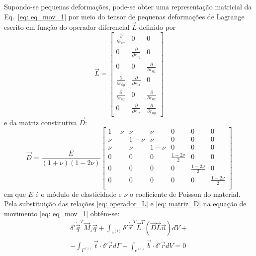 Supondo-se pequenas deformações, pode-se obter uma representação matricial da Eq.~\eqref{eq: eq_mov_1} por meio
do tensor de pequenas deformações de Lagrange escrito em função do operador diferencial
$\vec{L}$ definido por
\begin{equation}
    \vec{L} = \begin{bmatrix}
        \frac{\partial }{\partial r_{0x}} & 0 & 0 \\
        0 & \frac{\partial }{\partial r_{0y}} & 0 \\
        0 & 0 & \frac{\partial }{\partial r_{0z}} \\
        \frac{\partial }{\partial r_{0y}} & \frac{\partial }{\partial r_{0x}} & 0 \\
        \frac{\partial }{\partial r_{0z}} & 0 & \frac{\partial }{\partial r_{0x}} \\
        0 & \frac{\partial }{\partial r_{0z}} & \frac{\partial }{\partial r_{0y}}
    \end{bmatrix} \label{eq: operador_L}
\end{equation}
e da matriz constitutiva $\vec{D}$:
\begin{equation}
    \vec{D} = \frac{E}{(1+\nu)(1-2\nu)}\begin{bmatrix}
        1-\nu & \nu & \nu & 0 & 0 & 0 \\
        \nu & 1-\nu & \nu & 0 & 0 & 0 \\
        \nu & \nu & 1-\nu & 0 & 0 & 0 \\
        0 & 0 & 0 & \frac{1-2\nu}{2} & 0 & 0 \\
        0 & 0 & 0 & 0 & \frac{1-2\nu}{2} & 0 \\
        0 & 0 & 0 & 0 & 0 &\frac{1-2\nu}{2}  \\
    \end{bmatrix} \label{eq: matriz_D}
\end{equation}
em que $E$ é o módulo de elasticidade e $\nu$ o coeficiente de Poisson do material. Pela substituição das relações
\eqref{eq: operador_L} e \eqref{eq: matriz_D} na equação de movimento \eqref{eq: eq_mov_1} obtém-se:
\begin{equation}
\begin{split}
     \delta'\dot{\vec{q}}^T \vec{M}_i \ddot{\vec{q}} + 
    \int_{e^{(i)}}{\delta'\dot{\vec{r}}^T \vec{L}^T \left(\vec{D}\vec{L}\vec{u}\right)  dV} +\\
    - \int_{\Gamma^{(i)}}{\vec{t} \cdot \delta'\dot{\vec{r}} d\Gamma} 
    - \int_{e^{(i)}}{\vec{b}\cdot \delta'\dot{\vec{r}} dV} = 0
\end{split} \label{eq: eq_mov_2}
\end{equation}

